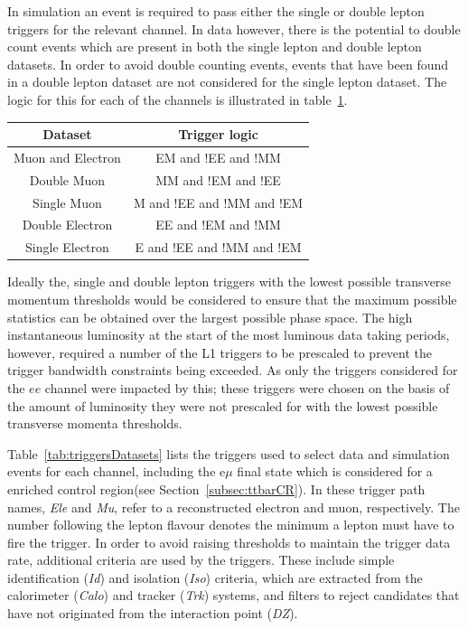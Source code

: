 In simulation an event is required to pass either the single or double lepton triggers for the relevant channel.
In data however, there is the potential to double count events which are present in both the single lepton and double lepton datasets.
In order to avoid double counting events, events that have been found in a double lepton dataset are not considered for the single lepton dataset.
The logic for this for each of the channels is illustrated in table~\ref{tab:triggerCombo}.

\begin{table}[htbp]
\label{tab:triggerCombo}
  \centering
   \begin{tabular}{cc}
   \hline
   \textbf{Dataset} & \textbf{Trigger logic}  \\
   \hline
   Muon and Electron & EM and !EE and !MM \\
   \hline
   Double Muon & MM and !EM and !EE\\
   Single Muon & M and !EE and !MM and !EM \\
   \hline  
   Double Electron & EE and !EM and !MM \\
   Single Electron & E and !EE and !MM and !EM \\
   \hline
 \end{tabular}%
\end{table}

Ideally the, single and double lepton triggers with the lowest possible transverse momentum thresholds would be considered to ensure that the maximum possible statistics can be obtained over the largest possible phase space.
The high instantaneous luminosity at the start of the most luminous data taking periods, however, required a number of the L1 triggers to be prescaled to prevent the trigger bandwidth constraints being exceeded.
As only the triggers considered for the $ee$ channel were impacted by this; these triggers were chosen on the basis of the amount of luminosity they were not prescaled for with the lowest possible transverse momenta thresholds.

Table~\ref{tab:triggersDatasets} lists the triggers used to select data and simulation events for each channel, including the e$\mu$ final state which is considered for a \ttbar enriched control region(see Section~\ref{subsec:ttbarCR}).
In these trigger path names, \emph{Ele} and \emph{Mu}, refer to a reconstructed electron and muon, respectively.
The number following the lepton flavour denotes the minimum \pT a lepton must have to fire the trigger.
In order to avoid raising \pT thresholds to maintain the trigger data rate, additional criteria are used by the triggers.
These include simple identification (\emph{Id}) and isolation (\emph{Iso}) criteria, which are extracted from the calorimeter (\emph{Calo}) and tracker (\emph{Trk}) systems, and filters to reject candidates that have not originated from the interaction point (\emph{DZ}).

